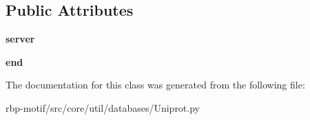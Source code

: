 \subsection*{Public Attributes}
\begin{DoxyCompactItemize}
\item 
\hypertarget{classsrc_1_1core_1_1util_1_1databases_1_1Uniprot_1_1Uniprot_a5a58033d38c71549ba313e4fedd51e51}{{\bfseries server}}\label{classsrc_1_1core_1_1util_1_1databases_1_1Uniprot_1_1Uniprot_a5a58033d38c71549ba313e4fedd51e51}

\item 
\hypertarget{classsrc_1_1core_1_1util_1_1databases_1_1Uniprot_1_1Uniprot_a2d38aa8160da150cbeb22c46f2c99af6}{{\bfseries end}}\label{classsrc_1_1core_1_1util_1_1databases_1_1Uniprot_1_1Uniprot_a2d38aa8160da150cbeb22c46f2c99af6}

\end{DoxyCompactItemize}


The documentation for this class was generated from the following file\-:\begin{DoxyCompactItemize}
\item 
rbp-\/motif/src/core/util/databases/Uniprot.\-py\end{DoxyCompactItemize}
